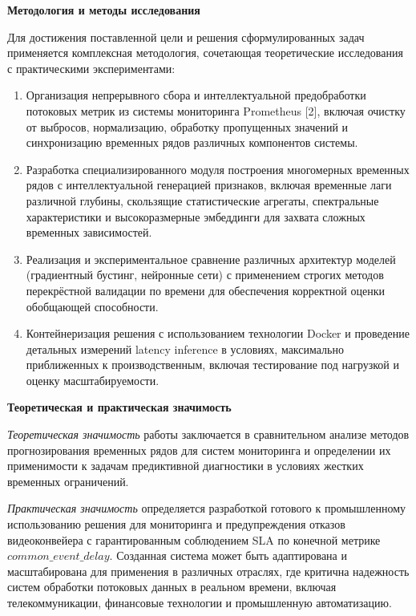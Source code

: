 \textbf{Методология и методы исследования}

\hspace*{1.25cm}Для достижения поставленной цели и решения сформулированных задач применяется комплексная методология, сочетающая теоретические исследования с практическими экспериментами:

\begin{enumerate}
	\item Организация непрерывного сбора и интеллектуальной предобработки потоковых метрик из системы мониторинга Prometheus [2], включая очистку от выбросов, нормализацию, обработку пропущенных значений и синхронизацию временных рядов различных компонентов системы.
	\item Разработка специализированного модуля построения многомерных временных рядов с интеллектуальной генерацией признаков, включая временные лаги различной глубины, скользящие статистические агрегаты, спектральные характеристики и высокоразмерные эмбеддинги для захвата сложных временных зависимостей.
	\item Реализация и экспериментальное сравнение различных архитектур моделей (градиентный бустинг, нейронные сети) с применением строгих методов перекрёстной валидации по времени для обеспечения корректной оценки обобщающей способности.
	\item Контейнеризация решения с использованием технологии Docker и проведение детальных измерений latency inference в условиях, максимально приближенных к производственным, включая тестирование под нагрузкой и оценку масштабируемости.
\end{enumerate}

\textbf{Теоретическая и практическая значимость}

\hspace*{1.25cm}\textit{Теоретическая значимость} работы заключается в сравнительном анализе методов прогнозирования временных рядов для систем мониторинга и определении их применимости к задачам предиктивной диагностики в условиях жестких временных ограничений.

\hspace*{1.25cm}\textit{Практическая значимость} определяется разработкой готового к промышленному использованию решения для мониторинга и предупреждения отказов видеоконвейера с гарантированным соблюдением SLA по конечной метрике $common\_event\_delay$. Созданная система может быть адаптирована и масштабирована для применения в различных отраслях, где критична надежность систем обработки потоковых данных в реальном времени, включая телекоммуникации, финансовые технологии и промышленную автоматизацию.
